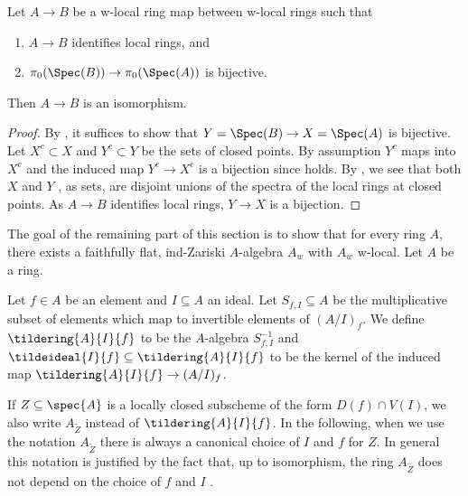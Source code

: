 \begin{lemma}[\stacksproject{097E}]
  \label{thm:isom-of-identifies-local-rings-w-local-isom-pi0}
  \leanok
  Let $A \to B$ be a w-local ring map between w-local rings such that
  \begin{enumerate}
    \item $A \to B$ identifies local rings, and
    \item $\pi_0(\Spec (B)) \to \pi_0(\Spec (A))$ is bijective.
  \end{enumerate}
  Then $A \to B$ is an isomorphism.
\end{lemma}

\begin{proof}
  \leanok
  By , it suffices to show
  that $Y = \Spec (B) \to X = \Spec (A)$ is bijective.
  Let $X^c \subset X$ and $Y^c \subset Y$ be the sets of closed points. By assumption $Y^c$ maps into $X^c$ and the induced map $Y^c \to X^c$ is a bijection since  holds. By , we see that both $X$ and $Y$ , as sets, are disjoint unions of the spectra of the local rings at closed points. As \(A \to B\) identifies local rings, $Y \to X$ is a bijection.
\end{proof}

The goal of the remaining part of this section is to show that for every ring $A$, there exists a faithfully flat, ind-Zariski
$A$-algebra $A_{w}$ with $A_w$ w-local. Let $A$ be a ring.

\begin{definition}
    Let $f \in A$ be an element and $I \subseteq A$ an ideal.
    Let $S_{f, I} \subseteq A$ be the multiplicative subset of elements which map to invertible
    elements of $(A/I)_{f}$.
    We define $\tildering{A}{I}{f}$ to be the $A$-algebra $S_{f, I}^{-1}$
    and $\tildeideal{I}{f} \subseteq \tildering{A}{I}{f}$ to be the kernel of
    the induced map $\tildering{A}{I}{f} \to (A / I)_{f}$.
    \label{def:tilde-locclosed}
    \leanok
\end{definition}

If $Z \subseteq \spec{A}$ is a locally closed subscheme of the form $D(f) \cap V(I)$, we
also write $A_{\widetilde{Z}}$ instead of $\tildering{A}{I}{f}$.
In the following, when we use the notation $A_{\widetilde{Z}}$ there is always a canonical
choice of $I$ and $f$ for $Z$.
In general this notation is justified by the fact that, up to isomorphism, the ring $A_{\widetilde{Z}}$ does not depend
on the choice of $f$ and $I$ .

